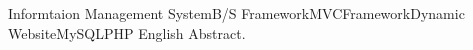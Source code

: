 
\begin{Eabstract}{Informtaion Management System}{B/S Framework}{MVCFramework}{Dynamic Website}{MySQL}{PHP}
English Abstract.
\end{Eabstract}
